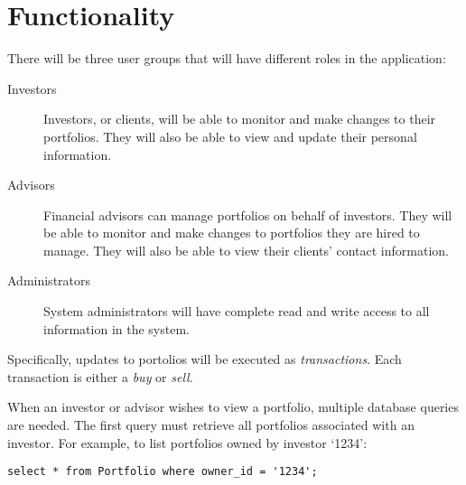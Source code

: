 \documentclass[letterpaper]{report}
\begin{document}
\section*{Functionality}
There will be three user groups that will have different roles in the application:
\begin{description}
	\item[Investors] Investors, or clients, will be able to monitor and make changes to their portfolios. They will also be able to view and update their personal information.
	\item[Advisors] Financial advisors can manage portfolios on behalf of investors. They will be able to monitor and make changes to portfolios they are hired to manage. They will also be able to view their clients' contact information.
	\item[Administrators] System administrators will have complete read and write access to all information in the system.
\end{description}

Specifically, updates to portolios will be executed as {\em transactions}. Each transaction is either a {\em buy} or {\em sell}.

When an investor or advisor wishes to view a portfolio, multiple database queries are needed. The first query must retrieve all portfolios associated with an investor. For example, to list portfolios owned by investor `1234':
\begin{verbatim}
select * from Portfolio where owner_id = '1234';
\end{verbatim}
\end{document}
